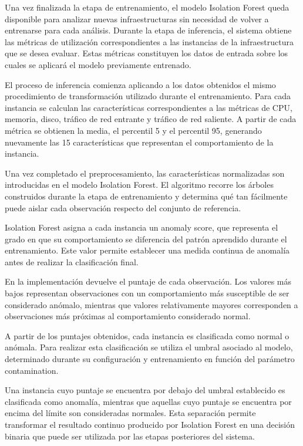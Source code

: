 Una vez finalizada la etapa de entrenamiento, el modelo Isolation Forest
queda disponible para analizar nuevas infraestructuras sin necesidad de
volver a entrenarse para cada análisis. Durante la etapa de inferencia,
el sistema obtiene las métricas de utilización correspondientes a las
instancias de la infraestructura que se desea evaluar. Estas métricas
constituyen los datos de entrada sobre los cuales se aplicará el modelo
previamente entrenado.

El proceso de inferencia comienza aplicando a los datos obtenidos el
mismo procedimiento de transformación utilizado durante el
entrenamiento. Para cada instancia se calculan las características
correspondientes a las métricas de CPU, memoria, disco, tráfico de red
entrante y tráfico de red saliente. A partir de cada métrica se obtienen
la media, el percentil 5 y el percentil 95, generando nuevamente las 15
características que representan el comportamiento de la instancia.

Una vez completado el preprocesamiento, las características normalizadas
son introducidas en el modelo Isolation Forest. El algoritmo recorre los
árboles construidos durante la etapa de entrenamiento y determina qué
tan fácilmente puede aislar cada observación respecto del conjunto de
referencia.

Isolation Forest asigna a cada instancia un anomaly score, que
representa el grado en que su comportamiento se diferencia del patrón
aprendido durante el entrenamiento. Este valor permite establecer una
medida continua de anomalía antes de realizar la clasificación final.

En la implementación devuelve el puntaje de cada observación. Los
valores más bajos representan observaciones con un comportamiento más
susceptible de ser considerado anómalo, mientras que valores
relativamente mayores corresponden a observaciones más próximas al
comportamiento considerado normal.

A partir de los puntajes obtenidos, cada instancia es clasificada como
normal o anómala. Para realizar esta clasificación se utiliza el umbral
asociado al modelo, determinado durante su configuración y entrenamiento
en función del parámetro contamination.

Una instancia cuyo puntaje se encuentra por debajo del umbral
establecido es clasificada como anomalía, mientras que aquellas cuyo
puntaje se encuentra por encima del límite son consideradas normales.
Esta separación permite transformar el resultado continuo producido por
Isolation Forest en una decisión binaria que puede ser utilizada por las
etapas posteriores del sistema.


